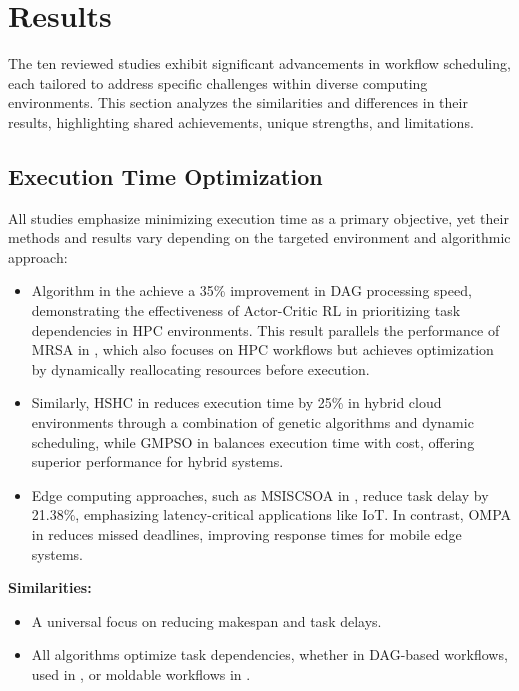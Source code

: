 \documentclass[a4paper, final]{article}
\begin{document}
\section{Results}
The ten reviewed studies exhibit significant advancements in workflow scheduling, each tailored to address 
specific challenges within diverse computing environments. This section analyzes the similarities and differences 
in their results, highlighting shared achievements, unique strengths, and limitations.

\subsection{Execution Time Optimization}
All studies emphasize minimizing execution time as a primary objective, yet their methods and results vary depending 
on the targeted environment and algorithmic approach:
\begin{itemize}
    \item Algorithm in the \cite{bib:1_acrl} achieve a 35\% improvement in DAG processing speed, demonstrating the effectiveness of 
    Actor-Critic RL in prioritizing task dependencies in HPC environments. This result parallels the performance of MRSA 
    in \cite{bib:8}, which also focuses on HPC workflows but achieves optimization by dynamically reallocating 
    resources before execution.

    \item Similarly, HSHC in \cite{bib:9} reduces execution time by 25\% in hybrid cloud environments through 
    a combination of genetic algorithms and dynamic scheduling, while GMPSO in \cite{bib:10} balances execution
    time with cost, offering superior performance for hybrid systems.

    \item Edge computing approaches, such as MSISCSOA in \cite{bib:3_sandcat}, reduce task delay by 21.38\%, emphasizing 
    latency-critical applications like IoT. In contrast, OMPA in \cite{bib:6_marine} reduces missed deadlines, improving 
    response times for mobile edge systems.
\end{itemize}

\noindent \textbf{Similarities:}
\begin{itemize}
    \item A universal focus on reducing makespan and task delays.
    \item All algorithms optimize task dependencies, whether in DAG-based workflows, used in \cite{bib:1_acrl},
    or moldable workflows in \cite{bib:8}.
\end{itemize}
\end{document}
